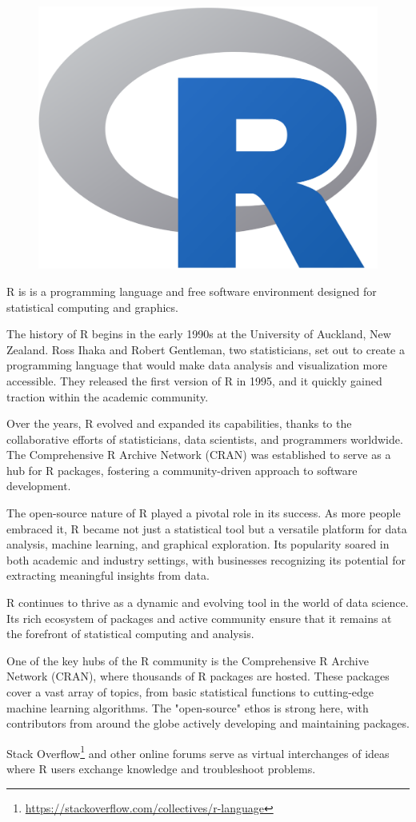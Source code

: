 \begin{figure}
\begin{center}
\includegraphics[height=.5in]{R_logo.png}
\end{center}
\end{figure}
R is is a programming language and free software environment designed for statistical computing and graphics. 

The history of R begins in the early 1990s at the University of Auckland, New Zealand. Ross Ihaka and Robert Gentleman, two statisticians, set out to create a programming language that would make data analysis and visualization more accessible. They released the first version of R in 1995, and it quickly gained traction within the academic community.

Over the years, R evolved and expanded its capabilities, thanks to the collaborative efforts of statisticians, data scientists, and programmers worldwide. The Comprehensive R Archive Network (CRAN) was established to serve as a hub for R packages, fostering a community-driven approach to software development.

The open-source nature of R played a pivotal role in its success. As more people embraced it, R became not just a statistical tool but a versatile platform for data analysis, machine learning, and graphical exploration. Its popularity soared in both academic and industry settings, with businesses recognizing its potential for extracting meaningful insights from data.

R continues to thrive as a dynamic and evolving tool in the world of data science. Its rich ecosystem of packages and active community ensure that it remains at the forefront of statistical computing and analysis. 

One of the key hubs of the R community is the Comprehensive R Archive Network (CRAN), where thousands of R packages are hosted. These packages cover a vast array of topics, from basic statistical functions to cutting-edge machine learning algorithms. The "open-source" ethos is strong here, with contributors from around the globe actively developing and maintaining packages.

Stack Overflow\footnote{\url{https://stackoverflow.com/collectives/r-language}} and other online forums serve as virtual interchanges of ideas where R users exchange knowledge and troubleshoot problems.


